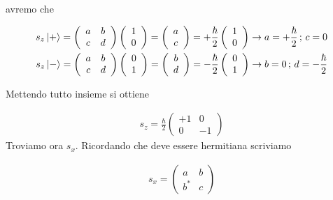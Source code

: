 avremo che

\begin{align}
s_z\ket{+}= \left(
\begin{array}{ccc}
a & b \\
c & d
\end{array}
\right)
\left(
\begin{array}{cc}
1 \\
0
\end{array}
\right) =
\left(
\begin{array}{cc}
a \\
c
\end{array}
\right) =
+\frac{\hbar}{2} \left(
\begin{array}{cc}
1 \\
0
\end{array}
\right) \rightarrow a= +\frac{\hbar}{2} \, ; \, c=0 \\
s_z\ket{-}= \left(
\begin{array}{ccc}
a & b \\
c & d
\end{array}
\right)
\left(
\begin{array}{cc}
0 \\
1
\end{array}
\right) =
\left(
\begin{array}{cc}
b \\
d
\end{array}
\right) =
-\frac{\hbar}{2} \left(
\begin{array}{cc}
0 \\
1
\end{array}
\right) \rightarrow  b=0 \, ; \, d=-\frac{\hbar}{2}
\end{align}

Mettendo tutto insieme si ottiene

\begin{align}
s_z = \frac{\hbar}{2}\left(
\begin{array}{ccc}
+1 & 0 \\
0 & -1
\end{array}
\right)
\end{align}
\newpage
Troviamo ora $s_x$. Ricordando che deve essere hermitiana scriviamo

\begin{align}
s_x = \left(
\begin{array}{ccc}
a & b \\
b^* & c
\end{array}
\right)
\end{align}

